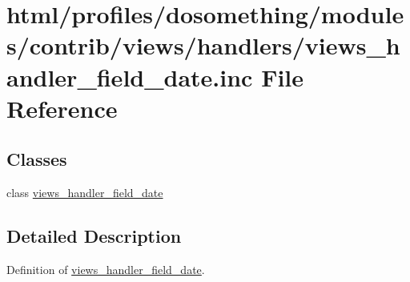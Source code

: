 \hypertarget{views__handler__field__date_8inc}{
\section{html/profiles/dosomething/modules/contrib/views/handlers/views\_\-handler\_\-field\_\-date.inc File Reference}
\label{views__handler__field__date_8inc}
}
\subsection*{Classes}
\begin{DoxyCompactItemize}
\item 
class \hyperlink{classviews__handler__field__date}{views\_\-handler\_\-field\_\-date}
\end{DoxyCompactItemize}


\subsection{Detailed Description}
Definition of \hyperlink{classviews__handler__field__date}{views\_\-handler\_\-field\_\-date}. 